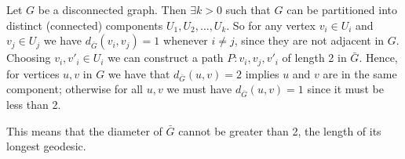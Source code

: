 Let $G$ be a disconnected graph. Then $\exists k > 0$ such that $G$ can be partitioned
into distinct (connected) components $U_1, U_2, \dots ,U_k$. So for any vertex $v_i \in U_i$ 
and $v_j \in U_j$ we have $d_{\bar{G}}\left(v_i, v_j\right) = 1$  whenever $ i \neq j$, since they are not adjacent
in $G$. Choosing $v_i , v'_i \in U_i$ we can construct a path $P: v_i, v_j, v'_i$ of length 2
in $\bar{G}$. Hence, for vertices $u,v$ in $G$ we have that $d_{\bar{G}}\left(u,v\right) = 2$  implies
$u$ and $v$ are in the same component;  otherwise for all $u,v$ we must have 
$d_{\bar{G}}\left(u,v\right) = 1$ since it must be less than 2.

This means that the diameter of $\bar{G}$ cannot be greater than 2,
the length of its longest geodesic.
